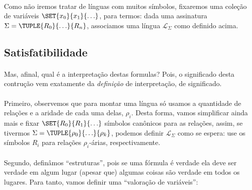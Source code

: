         \paragraph{}
            Como não iremos tratar de línguas com
            muitos símbolos, fixaremos uma coleção
            de variáveis $\SET{x_0}{x_1}{\ldots}$,
            para termos: dada uma assinatura $\Sigma= %
            \TUPLE{R_0}{\ldots}{R_n}$, associamos
            uma língua $\mathcal{L}_\Sigma$ como
            definido acima.

        \subsection{Satisfatibilidade}
        \paragraph{}
            Mas, afinal, qual é a interpretação
            destas formulas? Pois, o significado
            desta contrução vem exatamente da
            {\em definição} de interpretação, de
            significado. %
        \paragraph{}
            Primeiro, observemos que para montar
            uma língua só usamos a quantidade
            de relações e a aridade de cada uma
            delas, $\rho_i$. Desta forma, vamos
            simplificar ainda mais e fixar
            $\SET{R_0}{R_1}{\ldots}$ símbolos
            canônicos para as relações, assim, %
            se tivermos
            $\Sigma=\TUPLE{\rho_0}{\ldots}{\rho_k}$,
            podemos definir $\mathcal{L}_\Sigma$
            como se espera: use os símbolos $R_i$
            para relações $\rho_i$-árias,
            respectivamente.
        \paragraph{}
            Segundo, definâmos ``estruturas'',
            pois se uma fórmula é verdade ela deve
            ser verdade em algum lugar (apesar que) %
            algumas coisas são verdade em todos os
            lugares. Para tanto, vamos definir uma
            ``valoração de variáveis'':

